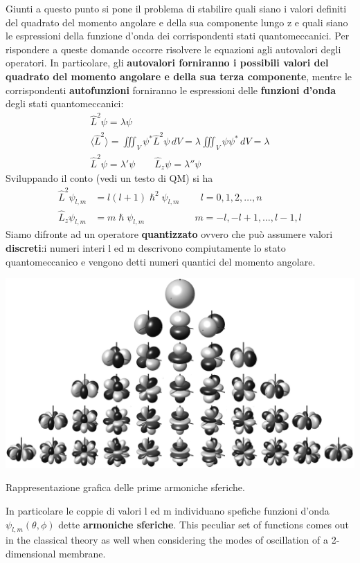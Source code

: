 Giunti a questo punto si pone il problema di stabilire quali siano i
valori definiti del quadrato del momento angolare e della sua componente
lungo z e quali siano le espressioni della funzione d'onda dei
corrispondenti stati quantomeccanici.
Per rispondere a queste domande
occorre risolvere le equazioni agli autovalori degli operatori.
In
particolare, gli \textbf{autovalori forniranno i possibili valori del
quadrato del momento angolare e della sua terza componente}, mentre le
corrispondenti \textbf{autofunzioni} forniranno le espressioni delle
\textbf{funzioni d'onda} degli stati quantomeccanici: \begin{gather*}
                                                          \hat{L}^{2}\psi = \lambda \psi\\
                                                          \langle \hat{L}^{2}\rangle = \iiint_{V} \psi^{*} \hat{L}^{2}\psi \, dV = \lambda \iiint_{V} \psi \psi^{*} \, dV = \lambda\\
                                                          \hat{L}^{2} \psi = \lambda' \psi \qquad  \hat{L}_{z} \psi = \lambda'' \psi
\end{gather*}
Sviluppando il conto (vedi un testo di QM) si ha
\begin{align*}
    \hat{L}^{2}\psi_{l,m} &= l(l+1) \hslash^{2} \psi_{l,m} \qquad  \, l = 0,1,2, \dots , n\\
    \hat{L}_{z} \psi_{l,m} &= m \hslash \psi_{l,m} \qquad  \qquad \quad \, m = -l,-l + 1, \dots ,l-1, l
\end{align*} Siamo difronte ad un operatore \textbf{quantizzato} ovvero che può
assumere valori \textbf{discreti}:i numeri interi l ed m descrivono
compiutamente lo stato quantomeccanico e vengono detti numeri quantici
del momento angolare.\\
\begin{marginfigure}
    \includegraphics{figs/spherical-harmonics}
    \caption{Rappresentazione grafica delle prime armoniche sferiche.}
    \label{fig:spherical-harmonics}
\end{marginfigure}
In particolare le coppie di valori l ed m individuano spefiche funzioni
d'onda \(\psi_{l,m}(\theta,\phi)\) dette \textbf{armoniche sferiche}.
This peculiar set of functions comes out in the classical theory as well
when considering the modes of oscillation of a 2-dimensional membrane.

